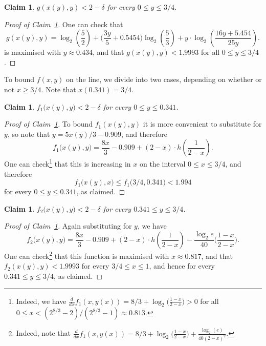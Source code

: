 \documentclass[12pt,reqno]{amsart}
\newtheorem{claim}[theorem]{Claim}
\theoremstyle{definition}
\theoremstyle{remark}
\newenvironment{clmproof}[1]{\begin{proof}[Proof of Claim~\ref{#1}]\let\qednow\qedsymbol\renewcommand{\qedsymbol}{}}{\; \qednow \end{proof}}
\renewcommand{\le}{\leqslant}
\renewcommand{\ge}{\geqslant}
\begin{document}
\begin{claim}\label{claim:AppA:G}
$g(x(y),y) < 2 - \delta$ for every $0 \le y \le 3/4$. 
\end{claim}
 
\begin{clmproof}{claim:AppA:G}
One can check that
$$g(x(y),y) = \log_2 \left( \frac{5}{2} \right) + \bigg( \frac{3y}{5} + 0.5454 \bigg) \log_2 \left(\frac{5}{3} \right) + y \cdot \log_2 \left( \frac{16y + 5.454}{25y} \right).$$  
is maximised with $y \approx 0.434$, and that $g(x(y),y) < 1.9993$ for all $0 \le y \le 3/4$.  
 \end{clmproof}

To bound $f(x,y)$ on the line, we divide into two cases, depending on whether or not $x \ge 3/4$. Note that $x(0.341) = 3/4$. 


\begin{claim}\label{claim:AppA:f1}
$f_1\big(x(y),y\big) < 2 - \delta$ for every $0 \le y \le 0.341$. 
\end{claim}
 
\begin{clmproof}{claim:AppA:f1}
To bound $f_1(x(y),y)$ it is more convenient to substitute for $y$, so note that $y = 5x(y)/3 - 0.909$, and therefore
\begin{equation}\label{eq:f1:line}
f_1\big(x(y),y\big) = \frac{8x}{3} - 0.909 + (2 - x) \cdot h\left(\frac{1}{2-x}\right).
\end{equation}
One can check\footnote{Indeed, we have $\frac{d}{dx} f_1(x,y(x)) = 8/3 + \log_2\big( \frac{1-x}{2-x} \big) > 0$ for all $0 \le x < (2^{8/3} - 2)/(2^{8/3} - 1) \approx 0.813$.} that this %
is increasing in $x$ on the interval $0 \le x \le 3/4$, and therefore 
$$f_1\big( x(y),x \big) \le f_1\big(3/4,0.341\big) < 1.994$$
for every $0 \le y \le 0.341$, as claimed. 
\end{clmproof}


\begin{claim}\label{claim:AppA:f2}
$f_2\big( x(y),y \big) < 2 - \delta$ for every $0.341 \le y \le 3/4$. 
\end{claim}
 
\begin{clmproof}{claim:AppA:f2}
Again substituting for $y$, we have 
$$f_2\big( x(y),y \big) = \frac{8x}{3} - 0.909 + (2-x) \cdot h\left(\frac{1}{2-x}\right) - \frac{\log_2 e}{40} \bigg( \frac{1-x}{2-x} \bigg).$$
One can check\footnote{Indeed, note that $\frac{d}{dx} f_1(x,y(x)) = 8/3 + \log_2\big( \frac{1-x}{2-x} \big) + \frac{\log_2(e)}{40(2-x)^2}$.} that this function is maximised with $x \approx 0.817$, and that $f_2( x(y),y ) < 1.9993$ for every $3/4 \le x \le 1$, and hence for every $0.341 \le y \le 3/4$, as claimed.
\end{clmproof}
\end{document}
